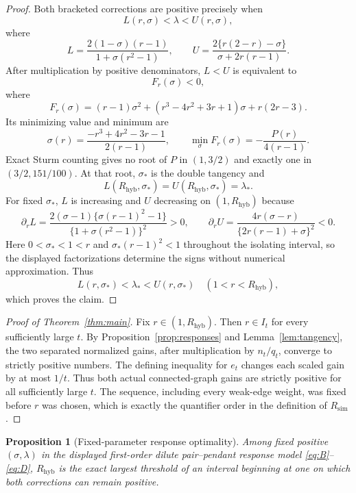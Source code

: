 \documentclass[11pt]{article}
\newtheorem{proposition}[theorem]{Proposition}
\theoremstyle{definition}
\theoremstyle{remark}
\newcommand{\Rsim}{R_{\mathrm{sim}}}
\newcommand{\Rhyb}{R_{\mathrm{hyb}}}
\begin{document}
\begin{proof}
Both bracketed corrections are positive precisely when
\[
 L(r,\sigma)<\lambda<U(r,\sigma),
\]
where
\[
 L=\frac{2(1-\sigma)(r-1)}{1+\sigma(r^2-1)},\qquad
 U=\frac{2\{r(2-r)-\sigma\}}{\sigma+2r(r-1)}.
\]
After multiplication by positive denominators, $L<U$ is equivalent to
\[
 F_r(\sigma)<0,
\]
where
\[
 F_r(\sigma)
 =(r-1)\sigma^2+(r^3-4r^2+3r+1)\sigma+r(2r-3).
\]
Its minimizing value and minimum are
\[
 \sigma(r)=\frac{-r^3+4r^2-3r-1}{2(r-1)},\qquad
 \min_\sigma F_r(\sigma)=-\frac{P(r)}{4(r-1)}.
\]
Exact Sturm counting gives no root of $P$ in $(1,3/2)$ and exactly one in
$(3/2,151/100)$.  At that root, $\sigma_*$ is the double tangency and
\[
 L(\Rhyb,\sigma_*)=U(\Rhyb,\sigma_*)=\lambda_*.
\]
For fixed $\sigma_*$, $L$ is increasing and $U$ decreasing on
$(1,\Rhyb)$ because
\[
 \partial_rL=
 \frac{2(\sigma-1)\{\sigma(r-1)^2-1\}}
      {\{1+\sigma(r^2-1)\}^2}>0,\qquad
 \partial_rU=
 \frac{4r(\sigma-r)}{\{2r(r-1)+\sigma\}^2}<0.
\]
Here $0<\sigma_*<1<r$ and
$\sigma_*(r-1)^2<1$ throughout the isolating interval, so the displayed
factorizations determine the signs without numerical approximation.
Thus
\[
 L(r,\sigma_*)<\lambda_*<U(r,\sigma_*)
 \quad(1<r<\Rhyb),
\]
which proves the claim.
\end{proof}

\begin{proof}[Proof of Theorem~\ref{thm:main}]
Fix $r\in(1,\Rhyb)$.  Then $r\in I_t$ for every sufficiently large $t$.
By Proposition~\ref{prop:responses} and Lemma~\ref{lem:tangency}, the two
separated normalized gains, after multiplication by $n_t/q_t$, converge to
strictly positive numbers.  The defining inequality for $e_t$ changes each
scaled gain by at most $1/t$.  Thus both actual connected-graph gains are
strictly positive for all sufficiently large $t$.  The sequence, including
every weak-edge weight, was fixed before $r$ was chosen, which is exactly the
quantifier order in the definition of $\Rsim$.
\end{proof}

\begin{proposition}[Fixed-parameter response optimality]
\label{prop:fixed-response-optimal}
Among fixed positive $(\sigma,\lambda)$ in the displayed first-order dilute
pair--pendant response model \eqref{eq:B}--\eqref{eq:D}, $\Rhyb$ is the exact
largest threshold of an interval beginning at one on which both corrections
can remain positive.
\end{proposition}
\end{document}
